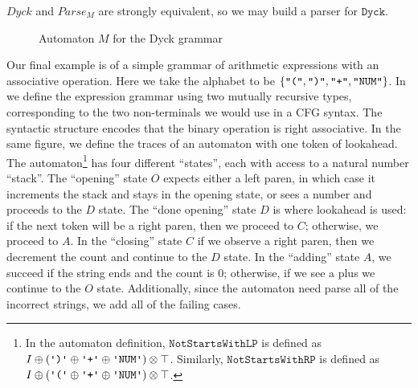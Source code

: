 \documentclass[acmsmall,nonacm]{acmart}
\newcommand{\literal}[1]{\texttt{\textquotesingle#1\textquotesingle}}
\newcommand{\stringquote}[1]{\texttt{\textquotedbl#1\textquotedbl}}
\newcommand{\agdalogo}{%
  \usebox{\logoagdabox}}%
\newcommand{\zenodolink}{https://zenodo.org/records/15049780}
\newcommand{\Agda}{\href{\zenodolink}{\agdalogo}}
\newcommand{\Dyck}{\mathtt{Dyck}}
\begin{document}
{\begin{theorem}[\Agda]
  \label{thm:dyck}
  $Dyck$ and $Parse_{M}$ are strongly equivalent, so we may build a parser for $\Dyck$.
\end{theorem}

\begin{figure}
  \footnotesize
  \caption{Automaton $M$ for the Dyck grammar}
  \label{fig:DyckAutomaton}
\end{figure}

Our final example is of a simple grammar of arithmetic expressions
with an associative operation. Here we take the alphabet to be $\{
\stringquote{(}, \stringquote{)}, \stringquote{+} , \stringquote{NUM}
\}$. In  we define the expression grammar
using two mutually
recursive types, corresponding to the two non-terminals we would use
in a CFG syntax. The syntactic structure encodes that the binary
operation is right associative. In the same figure, we define the
traces of an automaton with one token of lookahead. The automaton\footnote{In
  the automaton definition,
  $\texttt{NotStartsWithLP}$ is defined as
  \(I \oplus
  (\literal{)} \oplus \literal{+} \oplus \literal{NUM}) \otimes \top
  \). Similarly,
  $\texttt{NotStartsWithRP}$ is defined as
  \(I \oplus
  (\literal{(} \oplus \literal{+} \oplus \literal{NUM}) \otimes \top
  \).
}
has four different ``states'', each with access to a natural number
``stack''. The ``opening'' state $O$ expects either a left paren, in
which case it increments the stack and stays in the opening state, or
sees a number and proceeds to the $D$ state. The ``done opening''
state $D$ is where lookahead is used: if the next token will be a
right paren, then we proceed to $C$; otherwise, we proceed to $A$.
In the ``closing'' state $C$ if
we observe a right paren, then we decrement the count and continue to the
$D$ state. In the ``adding'' state $A$, we succeed if the string
ends and the count is $0$; otherwise, if we see a plus we continue to the $O$
state. Additionally, since the automaton need parse all of the
incorrect strings, we add all of the failing cases.

}
\end{document}
